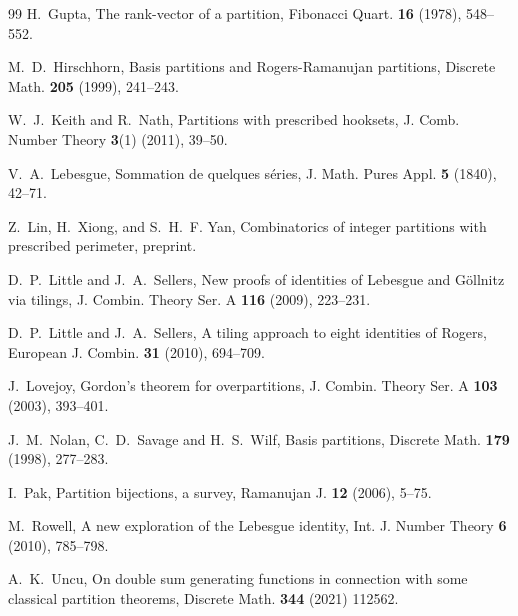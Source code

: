 \documentclass[11pt,reqno]{amsart}
\numberwithin{equation}{section}
\theoremstyle{plain}
\theoremstyle{definition}
\begin{document}
\begin{thebibliography}{99}
 H.~Gupta, The rank-vector of a partition, Fibonacci Quart. {\bf 16} (1978), 548--552.

 M.~D.~Hirschhorn, Basis partitions and Rogers-Ramanujan partitions, Discrete Math. {\bf 205} (1999), 241--243.

 W.~J.~Keith and R.~Nath, Partitions with prescribed hooksets, J. Comb. Number Theory {\bf 3}(1) (2011), 39--50.

 V.~A.~Lebesgue, Sommation de quelques s\'eries, J. Math. Pures Appl. {\bf 5} (1840), 42--71.

 Z.~Lin, H.~Xiong, and S.~H.~F. Yan, Combinatorics of integer partitions with prescribed perimeter, preprint.

 D.~P.~Little and J.~A.~Sellers, New proofs of identities of Lebesgue and G\"ollnitz via tilings, J. Combin. Theory Ser. A {\bf 116} (2009), 223--231.

 D.~P.~Little and J.~A.~Sellers, A tiling approach to eight identities of Rogers, European J. Combin. {\bf 31} (2010), 694--709.

 J.~Lovejoy, Gordon's theorem for overpartitions, J. Combin. Theory Ser. A {\bf 103} (2003), 393--401.

 J.~M.~Nolan, C.~D.~Savage and H.~S.~Wilf, Basis partitions, Discrete Math. {\bf 179} (1998), 277--283.

 I.~Pak, Partition bijections, a survey, Ramanujan J. {\bf 12} (2006), 5--75.

 M.~Rowell, A new exploration of the Lebesgue identity, Int. J. Number Theory {\bf 6} (2010), 785--798.

 A.~K.~Uncu, On double sum generating functions in connection with some classical partition theorems, Discrete Math. {\bf 344} (2021) 112562.




\end{thebibliography}
\end{document}
